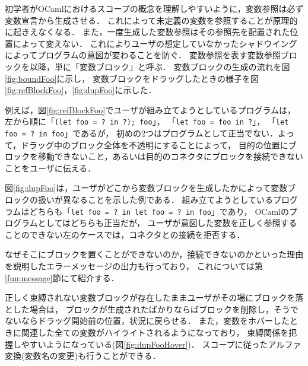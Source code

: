 初学者がOCamlにおけるスコープの概念を理解しやすいように，変数参照は必ず変数宣言から生成させる．
これによって未定義の変数を参照することが原理的に起きえなくなる．
また，一度生成した変数参照はその参照先を配置された位置によって変えない．
これによりユーザの想定していなかったシャドウイングによってプログラムの意図が変わることを防ぐ．
変数参照を表す変数参照ブロックを以降，単に「変数ブロック」と呼ぶ．
変数ブロックの生成の流れを図\ref{fig:boundFoo}に示し，
変数ブロックをドラッグしたときの様子を図\ref{fig:refBlockFoo}，\ref{fig:dupFoo}に示した．

例えば，図\ref{fig:refBlockFoo}でユーザが組み立てようとしているプログラムは，
左から順に「{\tt (let foo = ?\ in ?); foo}」，
「{\tt let foo = foo in ?}」，
「{\tt let foo = ?\ in foo}」であるが，
初めの2つはプログラムとして正当でない．よって，ドラッグ中のブロック全体を不透明にすることによって，
目的の位置にブロックを移動できないこと，あるいは目的のコネクタにブロックを接続できないことをユーザに伝える．

図\ref{fig:dupFoo}は，ユーザがどこから変数ブロックを生成したかによって変数ブロックの扱いが異なることを示した例である．
組み立てようとしているプログラムはどちらも「{\tt let foo = ?\ in let foo = ?\ in foo}」であり，
OCamlのプログラムとしてはどちらも正当だが，
ユーザが意図した変数を正しく参照することのできない左のケースでは，コネクタとの接続を拒否する．

なぜそこにブロックを置くことができないのか，接続できないのかといった理由を説明したエラーメッセージの出力も行っており，
これについては第\ref{fun:message}節にて紹介する．

正しく束縛されない変数ブロックが存在したままユーザがその場にブロックを落とした場合は，
ブロックが生成されたばかりならばブロックを削除し，そうでないならドラッグ開始前の位置，状況に戻らせる．
また，変数をホバーしたときに関連した全ての変数がハイライトされるようになっており，
束縛関係を把握しやすいようになっている(図\ref{fig:dupFooHover})．
スコープに従ったアルファ変換(変数名の変更)も行うことができる．

